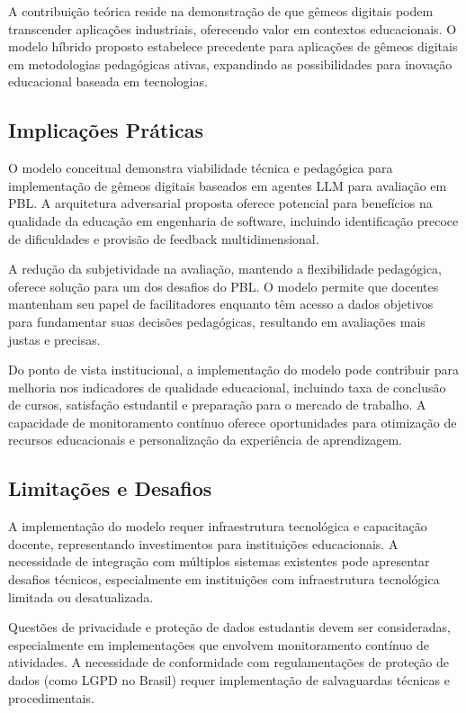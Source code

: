 \documentclass[english, spanish, brazilian]{modelo_dt}
\begin{document}
A contribuição teórica reside na demonstração de que gêmeos digitais podem transcender aplicações industriais, oferecendo valor em contextos educacionais\@. O modelo híbrido proposto estabelece precedente para aplicações de gêmeos digitais em metodologias pedagógicas ativas, expandindo as possibilidades para inovação educacional baseada em tecnologias\@.

\subsection{Implicações Práticas}

O modelo conceitual demonstra viabilidade técnica e pedagógica para implementação de gêmeos digitais baseados em agentes LLM para avaliação em PBL\@. A arquitetura adversarial proposta oferece potencial para benefícios na qualidade da educação em engenharia de software, incluindo identificação precoce de dificuldades e provisão de feedback multidimensional\@.

A redução da subjetividade na avaliação, mantendo a flexibilidade pedagógica, oferece solução para um dos desafios do PBL\@. O modelo permite que docentes mantenham seu papel de facilitadores enquanto têm acesso a dados objetivos para fundamentar suas decisões pedagógicas, resultando em avaliações mais justas e precisas\@.

Do ponto de vista institucional, a implementação do modelo pode contribuir para melhoria nos indicadores de qualidade educacional, incluindo taxa de conclusão de cursos, satisfação estudantil e preparação para o mercado de trabalho\@. A capacidade de monitoramento contínuo oferece oportunidades para otimização de recursos educacionais e personalização da experiência de aprendizagem\@.

\subsection{Limitações e Desafios}

A implementação do modelo requer infraestrutura tecnológica e capacitação docente, representando investimentos para instituições educacionais\@. A necessidade de integração com múltiplos sistemas existentes pode apresentar desafios técnicos, especialmente em instituições com infraestrutura tecnológica limitada ou desatualizada\@.

Questões de privacidade e proteção de dados estudantis devem ser consideradas, especialmente em implementações que envolvem monitoramento contínuo de atividades\@. A necessidade de conformidade com regulamentações de proteção de dados (como LGPD no Brasil) requer implementação de salvaguardas técnicas e procedimentais\@.
\end{document}

